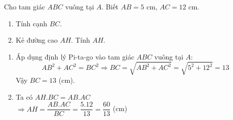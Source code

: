 \begin{ex}%
Cho tam giác $ABC$ vuông tại $A$. Biết $AB=5$ cm, $AC=12$ cm.
    \begin{enumerate}
        \item Tính cạnh $BC$.
        \item Kẻ đường cao $AH$. Tính $AH$.
    \end{enumerate}
\loigiai
    {
    \immini
    {\begin{enumerate}
        \item Áp dụng định lý Pi-ta-go vào tam giác $ABC$ vuông tại $A$: 
$$AB^2+AC^2=BC^2 \Rightarrow BC=\sqrt{AB^2+AC^2}=\sqrt{5^2+12^2}=13$$ 
Vậy $BC=13$ (cm).
        \item Ta có $AH.BC=AB.AC$\\
 $\Rightarrow AH=\dfrac{AB.AC}{BC}=\dfrac{5.12}{13}=\dfrac{60}{13}$ (cm)
    \end{enumerate} }
{}
    }
\end{ex}

